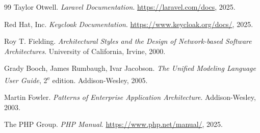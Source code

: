 \documentclass[12pt,a4paper,oneside]{report}
\begin{document}


\setcounter{page}{1}





\tableofcontents
\listoffigures
\listoftables

\newpage
{}
\setcounter{page}{1}








\begin{thebibliography}{99}
Taylor Otwell. \textit{Laravel Documentation}. \url{https://laravel.com/docs}, 2025.

Red Hat, Inc. \textit{Keycloak Documentation}. \url{https://www.keycloak.org/docs/}, 2025.

Roy T. Fielding. \textit{Architectural Styles and the Design of Network-based Software Architectures}. University of California, Irvine, 2000.

Grady Booch, James Rumbaugh, Ivar Jacobson. \textit{The Unified Modeling Language User Guide}, 2\textsuperscript{e} edition. Addison-Wesley, 2005.

Martin Fowler. \textit{Patterns of Enterprise Application Architecture}. Addison-Wesley, 2003.

The PHP Group. \textit{PHP Manual}. \url{https://www.php.net/manual/}, 2025.
\end{thebibliography}
\end{document}
